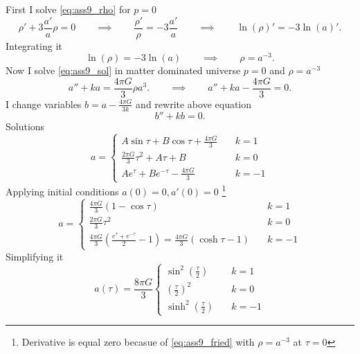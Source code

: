 First I solve \cref{eq:ass9_rho} for $p=0$
%
\begin{equation}
    \rho' + 3 \frac{a'}{a}\rho  = 0
    \qquad\implies\qquad
    \frac{\rho'}{\rho} = -3 \frac{a'}{a}
    \qquad\implies\qquad
    \ln(\rho)' = -3 \ln(a)'.
\end{equation}
%
Integrating it
%
\begin{equation}
    \ln(\rho) = -3\ln(a)
    \qquad\implies\qquad
    \rho = a^{-3}.
\end{equation}
%
Now I solve \cref{eq:ass9_sol} in matter dominated universe $p=0$ and
$\rho=a^{-3}$
%
\begin{equation}
    a'' + ka =
    \frac{4\pi G}{3} \rho a^3.
    \qquad\implies\qquad
    a'' + ka - \frac{4\pi G}{3} = 0.
\end{equation}
%
I change variables $b = a - \frac{4\pi G}{3k}$ and rewrite above equation
%
\begin{equation}
    b'' + kb = 0.
\end{equation}
%
Solutions
%
\begin{equation}
    a = \begin{cases}
        A \sin \tau + B\cos\tau + \frac{4\pi G}{3} & \quad k=1  \\
        \frac{2\pi G}{3}\tau^2 + A\tau + B         & \quad k=0  \\
        A e^{\tau} + Be^{-\tau} - \frac{4\pi G}{3} & \quad k=-1
    \end{cases}
\end{equation}
%
Applying initial conditions $a(0)=0, a'(0)=0$
\footnote{Derivative is equal zero becasue of \cref{eq:ass9_fried} with $\rho =
        a^{-3}$ at $\tau = 0$}
%
\begin{equation}
    a = \begin{cases}
        \frac{4\pi G}{3} \left(1 -  \cos\tau\right) & \quad k=1  \\
        \frac{2\pi G}{3}\tau^2                      & \quad k=0  \\
        \frac{4\pi G}{3} \left(\frac{e^{\tau} + e^{-\tau}}{2} - 1\right)=
        \frac{4\pi G}{3} \left(\cosh\tau - 1\right) & \quad k=-1
    \end{cases}
\end{equation}
%
Simplifying it
%
\begin{equation}
    \boxed{a(\tau) = \frac{8\pi G}{3}
        \begin{cases}
            \sin^2\left(\frac{\tau}{2}\right)  & \quad k=1  \\
            \left(\frac{\tau}{2}\right)^2      & \quad k=0  \\
            \sinh^2\left(\frac{\tau}{2}\right) & \quad k=-1
        \end{cases}}
\end{equation}
